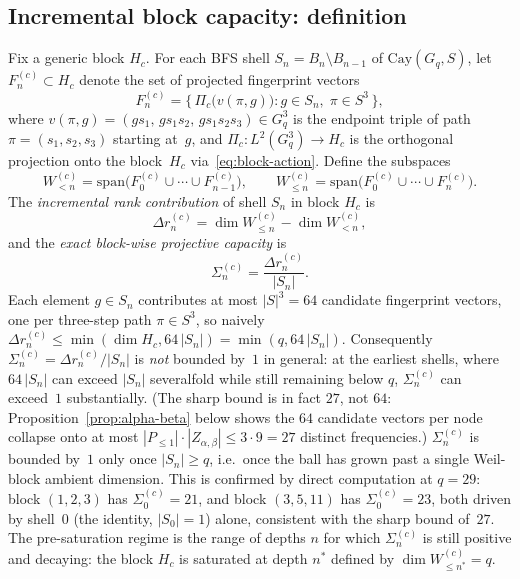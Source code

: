   \subsection{Incremental block capacity: definition}

    Fix a generic block $H_c$.
    For each BFS shell $S_n = B_n\setminus B_{n-1}$ of $\mathrm{Cay}(G_q,S)$, let
    $F_n^{(c)}\subset H_c$ denote the set of projected fingerprint vectors
    \begin{equation}
      F_n^{(c)}
      = \bigl\{\,\Pi_c\bigl(v(\pi,g)\bigr) : g\in S_n,\;\pi\in S^3\,\bigr\},
    \end{equation}
    where $v(\pi,g)=(g s_1,\,g s_1 s_2,\,g s_1 s_2 s_3)\in G_q^3$ is the endpoint triple of
    path $\pi=(s_1,s_2,s_3)$ starting at~$g$, and $\Pi_c: L^2(G_q^3)\to H_c$ is the
    orthogonal projection onto the block~$H_c$ via~\eqref{eq:block-action}.
    Define the subspaces
    \begin{equation}
      W_{<n}^{(c)} = \mathrm{span}\bigl(F_0^{(c)}\cup\cdots\cup F_{n-1}^{(c)}\bigr),
      \qquad
      W_{\leq n}^{(c)} = \mathrm{span}\bigl(F_0^{(c)}\cup\cdots\cup F_n^{(c)}\bigr).
    \end{equation}
    The \emph{incremental rank contribution} of shell $S_n$ in block $H_c$ is
    \begin{equation}
      \Delta r_n^{(c)} = \dim W_{\leq n}^{(c)} - \dim W_{<n}^{(c)},
    \end{equation}
    and the \emph{exact block-wise projective capacity} is
    \begin{equation}
      \Sigma_n^{(c)} = \frac{\Delta r_n^{(c)}}{|S_n|}.
      \label{eq:exact-cap}
    \end{equation}
    Each element $g\in S_n$ contributes at most $|S|^3=64$ candidate fingerprint vectors, one
    per three-step path $\pi\in S^3$, so naively $\Delta r_n^{(c)}\leq\min(\dim H_c, 64\,|S_n|)
    =\min(q, 64\,|S_n|)$.
    Consequently $\Sigma_n^{(c)}=\Delta r_n^{(c)}/|S_n|$ is \emph{not} bounded by~$1$ in
    general: at the earliest shells, where $64\,|S_n|$ can exceed $|S_n|$ severalfold while
    still remaining below $q$, $\Sigma_n^{(c)}$ can exceed~$1$ substantially.
    (The sharp bound is in fact $27$, not $64$: Proposition~\ref{prop:alpha-beta} below shows
    the $64$ candidate vectors per node collapse onto at most $|P_{\leq 1}|\cdot|Z_{\alpha,\beta}|
    \leq 3\cdot 9=27$ distinct frequencies.)
    $\Sigma_n^{(c)}$ is bounded by~$1$ only once $|S_n|\geq q$, i.e.\ once the ball has grown
    past a single Weil-block ambient dimension.
    This is confirmed by direct computation at $q=29$: block $(1,2,3)$ has
    $\Sigma_0^{(c)}=21$, and block $(3,5,11)$ has $\Sigma_0^{(c)}=23$, both driven by shell~$0$
    (the identity, $|S_0|=1$) alone, consistent with the sharp bound of~$27$.
    The pre-saturation regime is the range of depths $n$ for which $\Sigma_n^{(c)}$ is still
    positive and decaying: the block $H_c$ is saturated at depth $n^*$ defined by
    $\dim W_{\leq n^*}^{(c)}=q$.


